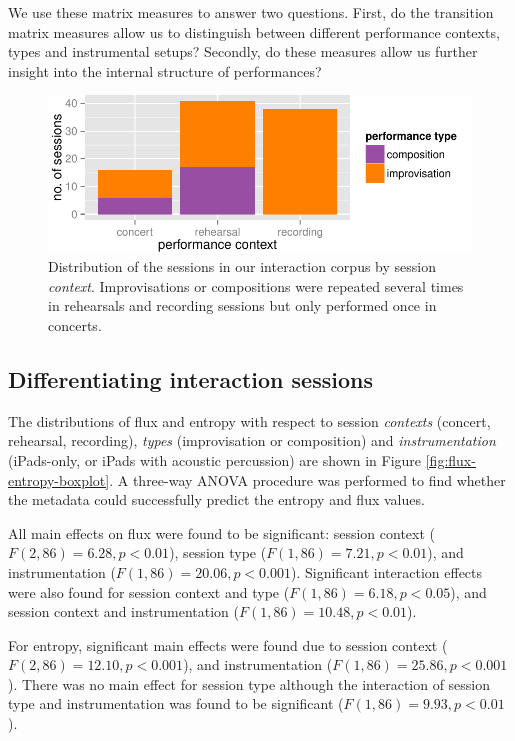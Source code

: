 \documentclass{sigchi}
\begin{document}
We use these matrix measures to answer
two questions. First, do the transition matrix measures allow us to
distinguish between different performance contexts, types and
instrumental setups? Secondly, do these measures allow us further
insight into the internal structure of performances?

\begin{figure}
  \centering
  \includegraphics[width=\linewidth]{figures/sessions-count}
  \caption{Distribution of the sessions in our interaction corpus by
    session {\em context}. Improvisations or compositions were repeated
    several times in rehearsals and recording sessions but only performed
    once in concerts.
    \label{fig:count-data}}
\end{figure}

\subsection{Differentiating interaction sessions}
\label{differentiating-interaction-sessions}

The distributions of flux and entropy with respect to session {\em contexts} (concert,
rehearsal, recording),
{\em types} (improvisation or composition) and {\em instrumentation} (iPads-only, or iPads with acoustic
percussion) are shown in Figure
\ref{fig:flux-entropy-boxplot}. A three-way ANOVA procedure was
performed to find whether the metadata could 
successfully predict the entropy and flux values.

All main effects on flux were found to be significant: session
context ($F(2,86) = 6.28, p < 0.01$), session type
($F(1,86) = 7.21, p < 0.01$), and instrumentation
($F(1,86) = 20.06, p < 0.001$). Significant interaction effects were
also found for session context and type
($F(1,86) = 6.18, p < 0.05$), and session context and
instrumentation ($F(1,86) = 10.48, p < 0.01$).

For entropy, significant main effects were found due to session
context ($F(2,86) = 12.10, p < 0.001$), and instrumentation
($F(1,86) = 25.86, p < 0.001$).
There was no main effect for session type although
 the interaction of session type and
instrumentation was found to be significant
($F(1,86) = 9.93, p<0.01$).
\end{document}
